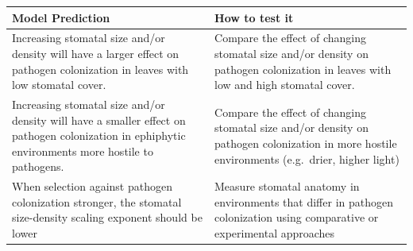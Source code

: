 \documentclass[utf8]{frontiersSCNS}
\begin{document}
\begin{longtable}[]{@{}ll@{}}
\toprule
\begin{minipage}[b]{0.50\columnwidth}\raggedright
Model Prediction\strut
\end{minipage} & \begin{minipage}[b]{0.44\columnwidth}\raggedright
How to test it\strut
\end{minipage}\tabularnewline
\midrule
\endhead
\begin{minipage}[t]{0.50\columnwidth}\raggedright
Increasing stomatal size and/or density will have a larger effect on
pathogen colonization in leaves with low stomatal cover.\strut
\end{minipage} & \begin{minipage}[t]{0.44\columnwidth}\raggedright
Compare the effect of changing stomatal size and/or density on pathogen
colonization in leaves with low and high stomatal cover.\strut
\end{minipage}\tabularnewline
\begin{minipage}[t]{0.50\columnwidth}\raggedright
Increasing stomatal size and/or density will have a smaller effect on
pathogen colonization in ephiphytic environments more hostile to
pathogens.\strut
\end{minipage} & \begin{minipage}[t]{0.44\columnwidth}\raggedright
Compare the effect of changing stomatal size and/or density on pathogen
colonization in more hostile environments (e.g.~drier, higher
light)\strut
\end{minipage}\tabularnewline
\begin{minipage}[t]{0.50\columnwidth}\raggedright
When selection against pathogen colonization stronger, the stomatal
size-density scaling exponent should be lower\strut
\end{minipage} & \begin{minipage}[t]{0.44\columnwidth}\raggedright
Measure stomatal anatomy in environments that differ in pathogen
colonization using comparative or experimental approaches\strut
\end{minipage}\tabularnewline
\bottomrule
\end{longtable}
\end{document}
